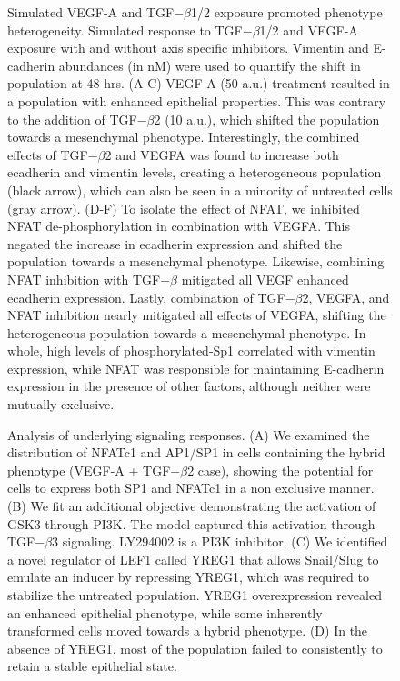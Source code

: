 \documentclass[11pt,letterpaper]{article}
\begin{document}
\clearpage

\begin{figure}
\caption{Simulated VEGF-A and TGF$-\beta$1/2 exposure promoted phenotype heterogeneity.
Simulated response to TGF$-\beta$1/2 and VEGF-A exposure with and without axis specific inhibitors.
Vimentin and E-cadherin abundances (in nM) were used to quantify the shift in population at 48 hrs.
(A-C) VEGF-A (50 a.u.) treatment resulted in a population with enhanced epithelial properties.
This was contrary to the addition of TGF$-\beta$2 (10 a.u.), which shifted the population towards a mesenchymal phenotype.
Interestingly, the combined effects of TGF$-\beta$2 and VEGFA was found to increase both ecadherin and vimentin levels, creating a heterogeneous population (black arrow), which can also be seen in a minority of untreated cells (gray arrow). (D-F) To isolate the effect of NFAT, we inhibited NFAT de-phosphorylation in combination with VEGFA. This negated the increase in ecadherin expression and shifted the population towards a mesenchymal phenotype.  Likewise, combining NFAT inhibition with TGF$-\beta$ mitigated all VEGF enhanced ecadherin expression.
Lastly, combination of TGF$-\beta$2, VEGFA, and NFAT inhibition nearly mitigated all effects of VEGFA, shifting the heterogeneous population towards a mesenchymal phenotype.
In whole, high levels of phosphorylated-Sp1 correlated with vimentin expression, while NFAT was responsible for maintaining E-cadherin expression in the presence of other factors, although neither were mutually exclusive.}
\label{fg:F3}
\end{figure}

\clearpage

\begin{figure}
\caption{Analysis of underlying signaling responses.
(A) We examined the distribution of NFATc1 and AP1/SP1 in cells containing the hybrid phenotype (VEGF-A + TGF$-\beta$2 case), showing the potential for cells to express both SP1 and NFATc1 in a non exclusive manner.
(B) We fit an additional objective demonstrating the activation of GSK3 through PI3K. The model captured this activation through TGF$-\beta$3 signaling. LY294002 is a PI3K inhibitor.
(C) We identified a novel regulator of LEF1 called YREG1 that allows Snail/Slug to emulate an inducer by repressing YREG1, which was required to stabilize the untreated population.
YREG1 overexpression revealed an enhanced epithelial phenotype, while some inherently transformed cells moved towards a hybrid phenotype.
(D) In the absence of YREG1, most of the population failed to consistently to retain a stable epithelial state.}\label{fg:F4}
\end{figure}
\end{document}
